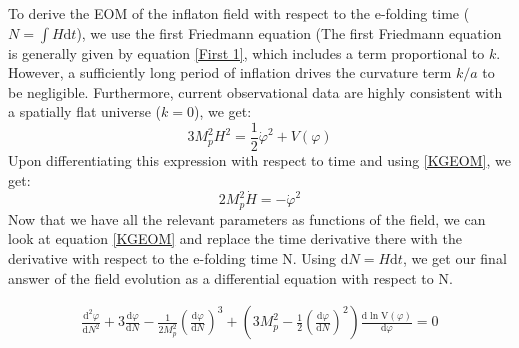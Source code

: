 \documentclass[aps,prd,reprint,preprintnumbers,showpacs,floatfix,nofootinbib,superscript address]{revtex4-2}
\begin{document}
 To derive the EOM of the inflaton field with respect to the e-folding time ($N = \int H \text{d}t$), we use the first Friedmann equation (The first Friedmann equation is generally given by equation \ref{First 1}, which includes a term proportional to $k$. However, a sufficiently long period of inflation drives the curvature term $k/a$ to be negligible. Furthermore, current observational data are highly consistent with a spatially flat universe ($k=0$), we get:
\begin{equation}    \label{Friedmann 3}
    3 M_p^2H^2 = \frac{1}{2} \dot{\varphi}^2 + V(\varphi)
\end{equation}
Upon differentiating this expression with respect to time and using \ref{KGEOM}, we get:
\begin{equation} \label{H vs phi}
    2 M_p^2 \dot{H} = -   \dot{\varphi}^2
\end{equation}
Now that we have all the relevant parameters as functions of the field, we can look at equation \ref{KGEOM} and replace the time derivative there with the derivative with respect to the e-folding time N. Using $\text{d}N = H \text{d}t$, we get our final answer of the field evolution as a differential equation with respect to N.
\begin{widetext}
\begin{subequations}
\begin{align}\label{phi vs N}
    \frac{\text{d}^2\varphi}{\text{d}N^2} +3 \frac{\text{d}\varphi}{\text{d}N}  - \frac{1}{2M_p^2} \left(\frac{\text{d}\varphi}{\text{d}N} \right)^3   +  \left( 3 M_p^2 - \frac{1}{2} \left(\frac{\text{d}\varphi}{\text{d}N} \right)^2 \right) \frac{\text{d}\ln \text{V}(\varphi)}{\text{d} \varphi} = 0    
\end{align}
\end{subequations}
\end{widetext}
\end{document}
